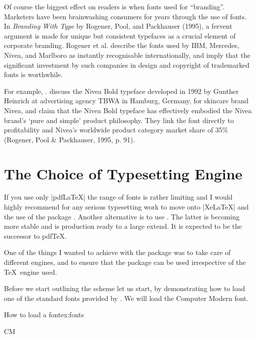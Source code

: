 Of course the biggest effect on readers is when fonts used for ``branding''. 
Marketers have been brainwashing
consumers for years through the use of fonts. In \textit{Branding
With Type}  by Rogener, Pool, and Packhauser
(1995), a fervent argument is made for unique
but consistent typefaces as a crucial element of
corporate branding. Rogener et al. describe the
fonts used by IBM, Mercedes, Nivea, and
Marlboro as instantly recognisable
internationally, and imply that the significant
investment by such companies in design and
copyright of trademarked fonts is worthwhile. 

For example, \citet*{rogener1995}. discuss the Nivea
Bold typeface developed in 1992 by Gunther
Heinrich at advertising agency \textsc{TBWA} in
Hamburg, Germany, for skincare brand Nivea,
and claim that the Nivea Bold typeface has
effectively embodied the Nivea brand’s `pure
and simple’ product philosophy. They link the
font directly to profitability and Nivea’s
worldwide product category market share of
35\% \cite[p. 91]{rogener1995} (Rogener, Pool \& Packhauser, 1995, p.
91).


{\small
\tiresias
\lorem

}

\section{The Choice of Typesetting Engine}

If you use only |pdfLaTeX| the range of fonts is rather limiting and I would highly recommend for any serious typesetting work to move onto |XeLaTeX| and the use of the package  \citep{fontspec}. Another alternative is to use \lualatex. The latter is becoming more stable and is production ready to a large extend. It is expected to be the successor to pdfTeX.

One of the things I wanted to achieve with the  package was  to take care of different \tex engines, and to ensure that the package can be used irrespective of the \TeX\ engine used. 

Before we start outlining the scheme let us start, by demonstrating how to load one of the standard fonts provided by \latexe. We will load the Computer Modern font. 

\begin{texexample}{How to load a font}{ex:fonts}
\newcommand{\fontdemo}[4][OT1]{
    \leavevmode
    \textcolor{thefontname}{#2}
    \fontencoding{#1}\fontfamily{#3}\selectfont#4 }

\fontdemo{CM}{cmtt}{ \alphabet\par}

\fox
\end{texexample}

